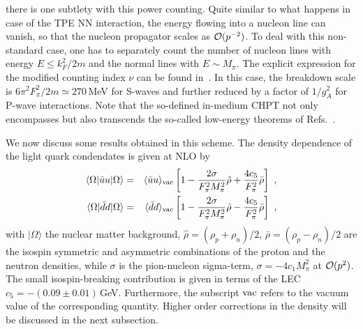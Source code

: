 \documentclass[aps,rmp,nofootinbib,twocolumn,floatfix]{revtex4}
\newcommand{\beqa}{\begin{eqnarray}}
\newcommand{\eeqa}{\end{eqnarray}}
\begin{document}
there is one subtlety with this power counting. Quite similar to
what happens in case of the TPE NN interaction, the energy flowing
into a nucleon line can vanish, so that the nucleon propagator
scales as ${\cal O} (p^{-2})$. To deal with this non-standard case, one
has to separately count the number of nucleon lines with energy
$E \leq k_F^2/2m$ and the normal lines with $E \sim M_\pi$. 
The explicit expression for the modified
counting index $\nu$ can be found in~\cite{Meissner:2001gz}.
In this case, the breakdown scale is $6\pi^2 F_\pi^2/2m \simeq
270\,$MeV for S-waves and further reduced by a factor of $1/g_A^2$
for P-wave interactions. Note that the so-defined in-medium CHPT 
not only encompasses but also transcends the so-called low-energy 
theorems of Refs.~\cite{Drukarev:1988kd,Furnstahl:1992pi,Birse:1994cz}.

We now discuss some results obtained in this scheme. 
The density dependence of the light quark condendates is given at NLO by
\beqa
 \label{qc}
 \langle \Omega|\bar{u}u|\Omega\rangle
&=&\langle \bar{u}u \rangle_{\rm vac}
 \left[1-\frac{2\sigma}{F^2_\pi M_\pi^2}\hat{\rho}
 +\frac{4 c_5}{F_\pi^2}\bar{\rho}\right]\nonumber~,\\
 \langle \Omega|\bar{d}d|\Omega\rangle
&=&\langle \bar{d}d \rangle_{\rm vac}
 \left[1-\frac{2\sigma}{F_\pi^2 M_\pi^2}\hat\rho
-\frac{4 c_5}{F_\pi^2}\bar\rho\right]~,
\eeqa
with $|\Omega\rangle$ the nuclear matter background, $\hat \rho
= (\rho_p + \rho_n)/2$,  $\bar \rho =(\rho_p - \rho_n)/2$ are the
isospin symmetric and asymmetric combinations of the proton and the
neutron densities, while $\sigma$ is the pion-nucleon sigma-term, 
$\sigma=-4c_1 M_\pi^2$ at ${\cal O}(p^2)$. The small isospin-breaking
contribution is given in terms of the LEC $c_5 = -(0.09\pm
0.01)\,$GeV. Furthermore, the subscript $\rm vac$ refers to the vacuum 
value of the corresponding quantity. Higher order corrections in
the density will be discussed in the next subsection. 
\end{document}
